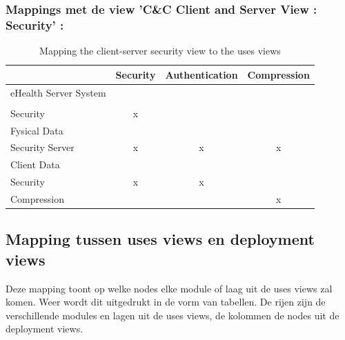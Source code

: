 \documentclass[a4paper,10pt]{article}
\begin{document}
\subsubsection{Mappings met de view 'C\&C Client and Server View : Security' :}
\begin{table}[h!]
\begin{center}
 \begin{tabular}{l| c | c | c |} 
 & Security & Authentication & Compression \\ \hline
eHealth Server System & & & \\ \hline
\hspace{6pt} & & & \\ \hline
\hspace{12pt}Security & x & & \\ \hline
\hspace{6pt}Fysical Data & & & \\ \hline
\hspace{12pt}Security Server & x & x & x \\ \hline
\hspace{6pt}Client Data & & & \\ \hline
\hspace{12pt}Security & x & x & \\ \hline
\hspace{12pt}Compression & & & x \\ \hline
\end{tabular}
\caption{Mapping the client-server security view to the uses views}
\end{center}
\end{table}

\subsection{Mapping tussen uses views en deployment views}
Deze mapping toont op welke nodes elke module of laag uit de uses views zal komen. Weer wordt dit uitgedrukt in de vorm van tabellen. De rijen zijn de verschillende modules en lagen uit de uses views, de kolommen de nodes uit de deployment views.
\end{document}
